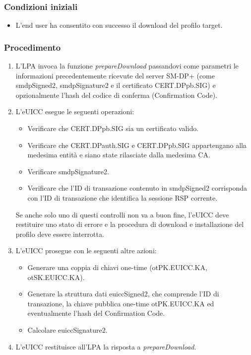 \documentclass[10pt, oneside]{book}
\begin{document}
\subsubsection{Condizioni iniziali}
\begin{itemize}
\item L'end user ha consentito con successo il download del profilo target.
\end{itemize}

\subsubsection{Procedimento}
\begin{enumerate}
\item L'LPA invoca la funzione \textit{prepareDownload} passandovi come parametri le informazioni precedentemente ricevute del server SM-DP+ (come smdpSigned2, smdpSignature2 e il certificato CERT.DPpb.SIG) e opzionalmente l'hash del codice di conferma (Confirmation Code).
\item L'eUICC esegue le seguenti operazioni:
\begin{itemize}[itemsep=0pt]
\item Verificare che CERT.DPpb.SIG sia un certificato valido.
\item Verificare che CERT.DPauth.SIG e CERT.DPpb.SIG appartengano alla medesima entità e siano state rilasciate dalla medesima CA.
\item Verificare smdpSignature2.
\item Verificare che l'ID di transazione contenuto in smdpSigned2 corrisponda con l'ID di transazione che identifica la sessione RSP corrente.
\end{itemize}
Se anche solo uno di questi controlli non va a buon fine, l'eUICC deve restituire uno stato di errore e la procedura di download e installazione del profilo deve essere interrotta. 
\item L'eUICC prosegue con le seguenti altre azioni:
\begin{itemize}[itemsep=0pt]
\item Generare una coppia di chiavi one-time (otPK.EUICC.KA, otSK.EUICC.KA).
\item Generare la struttura dati euiccSigned2, che comprende l'ID di transazione, la chiave pubblica one-time otPK.EUICC.KA ed eventualmente l'hash del Confirmation Code.
\item Calcolare euiccSignature2.
\end{itemize}
\item L'eUICC restituisce all'LPA la risposta a \textit{prepareDownload}.

\end{enumerate}
\end{document}

